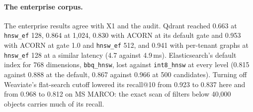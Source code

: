 \paragraph{The enterprise corpus.}
The enterprise results agree with X1 and the audit. Qdrant reached 0.663 at \texttt{hnsw\_ef} 128,
0.864 at 1,024, 0.830 with ACORN at its default gate and 0.953 with ACORN at gate 1.0 and
\texttt{hnsw\_ef} 512, and 0.941 with per-tenant graphs at \texttt{hnsw\_ef} 128 at a similar latency
(4.7 against 4.9\,ms). Elasticsearch's default index for 768 dimensions, \texttt{bbq\_hnsw},
lost against \texttt{int8\_hnsw} at every level (0.815 against 0.888 at the default, 0.867 against
0.966 at 500 candidates). Turning off Weaviate's flat-search cutoff lowered its recall@10 from 0.923
to 0.837 here and from 0.968 to 0.812 on MS MARCO: the exact scan of filters below 40,000 objects
carries much of its recall.
